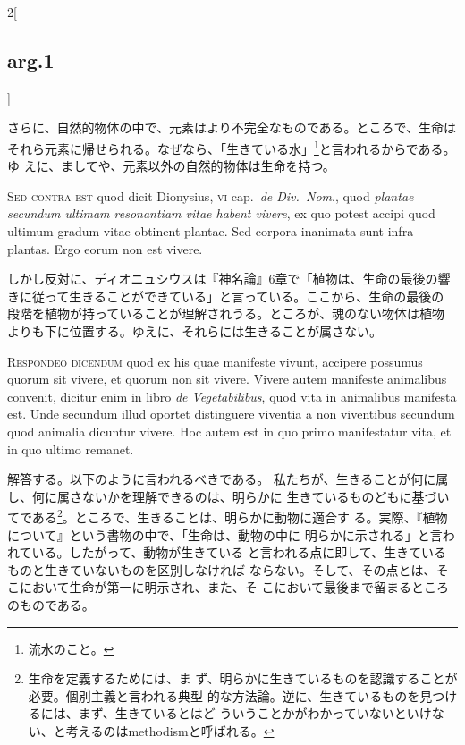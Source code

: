 \documentclass[paper=a4paper,fontsize=10pt,jafontsize=9pt,titlepage]{jlreq}
\begin{document}
\begin{paracol}{2}[\subsection{arg.1}]
\switchcolumn

さらに、自然的物体の中で、元素はより不完全なものである。ところで、生命は
 それら元素に帰せられる。なぜなら、「生きている水」\footnote{流水のこと。}と言われるからである。ゆ
 えに、ましてや、元素以外の自然的物体は生命を持つ。

\switchcolumn*[\subsection{s.c.}]


{\scshape  Sed contra est} quod dicit Dionysius, {\scshape vi} cap.~{\itshape de Div.~Nom}.,
 quod {\itshape plantae secundum ultimam resonantiam vitae habent vivere}, ex quo
 potest accipi quod ultimum gradum vitae obtinent plantae. Sed corpora
 inanimata sunt infra plantas. Ergo eorum non est vivere.

\switchcolumn

しかし反対に、ディオニュシウスは『神名論』6章で「植物は、生命の最後の響
 きに従って生きることができている」と言っている。ここから、生命の最後の
 段階を植物が持っていることが理解されうる。ところが、魂のない物体は植物
 よりも下に位置する。ゆえに、それらには生きることが属さない。



{\scshape Respondeo dicendum} quod ex his quae manifeste vivunt,
 accipere possumus quorum sit vivere, et quorum non sit vivere. Vivere
 autem manifeste animalibus convenit, dicitur enim in libro {\itshape de
 Vegetabilibus}, quod vita in animalibus manifesta est. Unde secundum
 illud oportet distinguere viventia a non viventibus secundum quod
 animalia dicuntur vivere. Hoc autem est in quo primo manifestatur vita,
 et in quo ultimo remanet.

\switchcolumn

解答する。以下のように言われるべきである。
私たちが、生きることが何に属し、何に属さないかを理解できるのは、明らかに
 生きているものどもに基づいてである\footnote{生命を定義するためには、ま
 ず、明らかに生きているものを認識することが必要。個別主義と言われる典型
 的な方法論。逆に、生きているものを見つけるには、まず、生きているとはど
 ういうことかがわかっていないといけない、と考えるのはmethodismと呼ばれる。}。ところで、生きることは、明らかに動物に適合す
 る。実際、『植物について』という書物の中で、「生命は、動物の中に
 明らかに示される」と言われている。したがって、動物が生きている
 と言われる点に即して、生きているものと生きていないものを区別しなければ
 ならない。そして、その点とは、そこにおいて生命が第一に明示され、また、そ
 こにおいて最後まで留まるところのものである。


\end{paracol}
\end{document}
